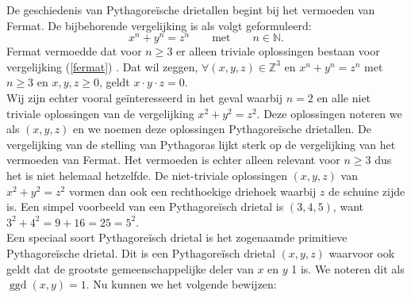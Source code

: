 \documentclass[12pt,reqno]{article}
\newcommand*{\NN}{\ensuremath{\mathbb{N}}}
\newcommand*{\ZZ}{\ensuremath{\mathbb{Z}}}
\theoremstyle{theorem}
\theoremstyle{definition}
\DeclareMathOperator{\ggd}{ggd}
\begin{document}
	De geschiedenis van Pythagore\"ische drietallen begint bij het vermoeden van Fermat. De bijbehorende vergelijking is als volgt geformuleerd:
	\begin{equation}\label{fermat}
		x^n + y^n = z^n \qquad \text{met} \qquad n \in \NN.
	\end{equation}
	Fermat vermoedde dat voor $n \geq 3$ er alleen triviale oplossingen bestaan voor vergelijking (\ref{fermat}) . Dat wil zeggen, $\forall (x,y,z) \in \ZZ^3$ en $x^n + y^n = z^n$ met $n \geq 3$ en $x, y, z \geq 0$, geldt $x \cdot y \cdot z = 0$. \\
	Wij zijn echter vooral ge\"interesseerd in het geval waarbij $n=2$ en alle niet triviale oplossingen van de vergelijking $x^2 + y^2 = z^2$. Deze oplossingen noteren we als $(x,y,z)$ en we noemen deze oplossingen Pythagore\"ische drietallen. De vergelijking van de stelling van Pythagoras lijkt sterk op de vergelijking van het vermoeden van Fermat. Het vermoeden is echter alleen relevant voor $n \geq 3$ dus het is niet helemaal hetzelfde. De niet-triviale oplossingen $(x,y,z)$ van $x^2 + y^2 = z^2$ vormen dan ook een rechthoekige driehoek waarbij $z$ de schuine zijde is. Een simpel voorbeeld van een Pythagore\"isch drietal is $(3,4,5)$, want $3^2 + 4^2 = 9 + 16 = 25 = 5^2$. \\
	Een speciaal soort Pythagore\"isch drietal is het zogenaamde primitieve \mbox{Pythagore\"ische} drietal. Dit is een Pythagore\"isch drietal $(x,y,z)$ waarvoor ook geldt dat de grootste gemeenschappelijke deler van $x$ en $y$ 1 is. We noteren dit als $\ggd(x,y) = 1$. Nu kunnen we het volgende bewijzen:
	
\end{document}
